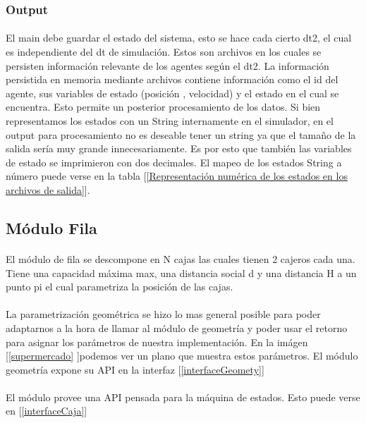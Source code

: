 \documentclass{article}
\begin{document}
\subsubsection{Output}

\paragraph{}
El main debe guardar el estado del sistema, esto se hace cada cierto dt2, el cual es independiente del dt de simulación. Estos son archivos en los cuales se persisten información relevante de los agentes según el dt2. La información persistida en memoria mediante archivos contiene información como el id del agente, sus variables de estado (posición , velocidad) y el estado en el cual se encuentra. Esto permite un posterior procesamiento de los datos. Si bien representamos los estados con un String internamente en el simulador, en el output para procesamiento no es deseable tener un string ya que el tamaño de la salida sería muy grande innecesariamente. Es por esto que también las variables de estado se imprimieron con dos decimales. El mapeo de los estados String a número puede verse en la tabla [\ref {Representación numérica de los estados en los archivos de salida}].


\subsection{Módulo Fila}

\paragraph{}
El módulo de fila se descompone en N cajas las cuales tienen 2 cajeros cada una. Tiene una capacidad máxima max, una distancia social d y una distancia H a un punto pi el cual parametriza la posición de las cajas.

\paragraph{}
La parametrización geométrica se hizo lo mas general posible para poder adaptarnos a la hora de llamar al módulo de geometría y poder usar el retorno para asignar los parámetros de nuestra implementación. En la imágen [\ref{supermercado} ]podemos ver un plano que muestra estos parámetros. El módulo geometría expone su API en la interfaz [\ref{interfaceGeomety}]

\paragraph{}
El módulo provee una API pensada para la máquina de estados. Esto puede verse en [\ref{interfaceCaja}]
\end{document}
